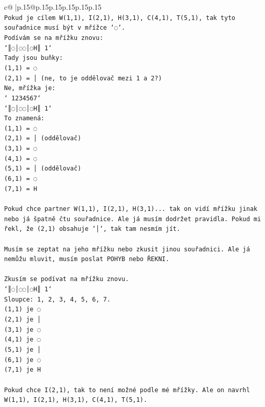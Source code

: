 \documentclass{article}
\begin{document}
{\begin{supertabular}{c@{$\;$}|p{.15\linewidth}@{}p{.15\linewidth}p{.15\linewidth}p{.15\linewidth}p{.15\linewidth}p{.15\linewidth}}
{{{\\ 
\texttt{Pokud je cílem W(1,1), I(2,1), H(3,1), C(4,1), T(5,1), tak tyto souřadnice musí být v mřížce `◌`. } \\
\texttt{Podívám se na mřížku znovu:} \\
\texttt{`║◌│◌◌│◌H║ 1`} \\
\texttt{Tady jsou buňky:} \\
\texttt{(1,1) = ◌} \\
\texttt{(2,1) = │ (ne, to je oddělovač mezi 1 a 2?)} \\
\texttt{Ne, mřížka je:} \\
\texttt{` 1234567`} \\
\texttt{`║◌│◌◌│◌H║ 1`} \\
\texttt{To znamená:} \\
\texttt{(1,1) = ◌} \\
\texttt{(2,1) = │ (oddělovač)} \\
\texttt{(3,1) = ◌} \\
\texttt{(4,1) = ◌} \\
\texttt{(5,1) = │ (oddělovač)} \\
\texttt{(6,1) = ◌} \\
\texttt{(7,1) = H} \\
\\ 
\texttt{Pokud chce partner W(1,1), I(2,1), H(3,1)... tak on vidí mřížku jinak nebo já špatně čtu souřadnice. Ale já musím dodržet pravidla. Pokud mi řekl, že (2,1) obsahuje `│`, tak tam nesmím jít.} \\
\\ 
\texttt{Musím se zeptat na jeho mřížku nebo zkusit jinou souřadnici. Ale já nemůžu mluvit, musím poslat POHYB nebo ŘEKNI.} \\
\\ 
\texttt{Zkusím se podívat na mřížku znovu.} \\
\texttt{`║◌│◌◌│◌H║ 1`} \\
\texttt{Sloupce: 1, 2, 3, 4, 5, 6, 7.} \\
\texttt{(1,1) je ◌} \\
\texttt{(2,1) je │} \\
\texttt{(3,1) je ◌} \\
\texttt{(4,1) je ◌} \\
\texttt{(5,1) je │} \\
\texttt{(6,1) je ◌} \\
\texttt{(7,1) je H} \\
\\ 
\texttt{Pokud chce I(2,1), tak to není možné podle mé mřížky. Ale on navrhl W(1,1), I(2,1), H(3,1), C(4,1), T(5,1). } \\
}}}
\end{supertabular}}
\end{document}
